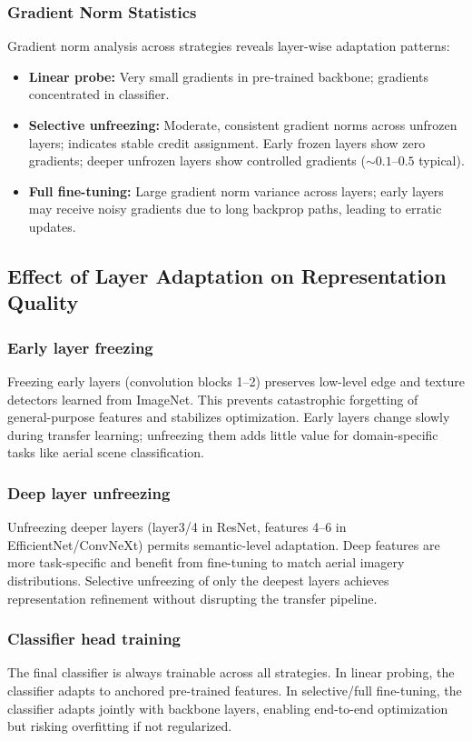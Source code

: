 \documentclass[11pt,a4paper]{article}
\begin{document}
\subsubsection*{Gradient Norm Statistics}
Gradient norm analysis across strategies reveals layer-wise adaptation patterns:

\begin{itemize}
	\item \textbf{Linear probe:} Very small gradients in pre-trained backbone; gradients concentrated in classifier.
	\item \textbf{Selective unfreezing:} Moderate, consistent gradient norms across unfrozen layers; indicates stable credit assignment. Early frozen layers show zero gradients; deeper unfrozen layers show controlled gradients ($\sim 0.1$--$0.5$ typical).
	\item \textbf{Full fine-tuning:} Large gradient norm variance across layers; early layers may receive noisy gradients due to long backprop paths, leading to erratic updates.
\end{itemize}

\subsection{Effect of Layer Adaptation on Representation Quality}

\subsubsection*{Early layer freezing}
Freezing early layers (convolution blocks 1--2) preserves low-level edge and texture detectors learned from ImageNet. This prevents catastrophic forgetting of general-purpose features and stabilizes optimization. Early layers change slowly during transfer learning; unfreezing them adds little value for domain-specific tasks like aerial scene classification.

\subsubsection*{Deep layer unfreezing}
Unfreezing deeper layers (layer3/4 in ResNet, features 4--6 in EfficientNet/ConvNeXt) permits semantic-level adaptation. Deep features are more task-specific and benefit from fine-tuning to match aerial imagery distributions. Selective unfreezing of only the deepest layers achieves representation refinement without disrupting the transfer pipeline.

\subsubsection*{Classifier head training}
The final classifier is always trainable across all strategies. In linear probing, the classifier adapts to anchored pre-trained features. In selective/full fine-tuning, the classifier adapts jointly with backbone layers, enabling end-to-end optimization but risking overfitting if not regularized.
\end{document}

